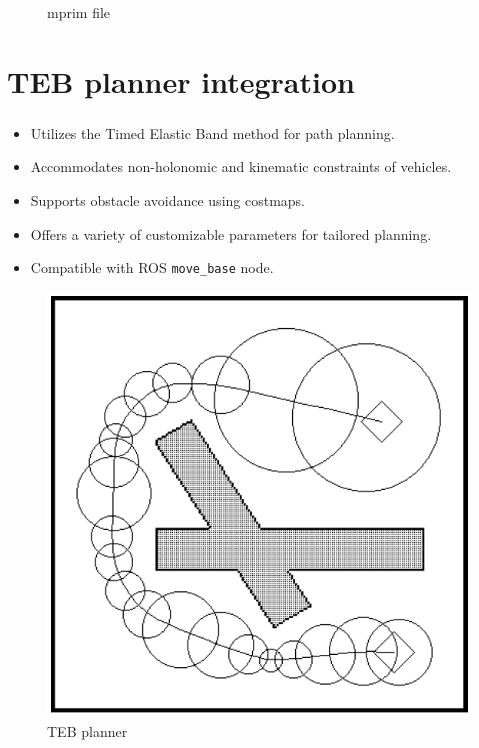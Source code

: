 \documentclass[numberofslides]{AMSBeamer}
\begin{document}
\begin{frame}[label=agenda]
\begin{minipage}{0.3\textwidth}
\begin{figure}
            \caption{mprim file}
        \end{figure}
    \end{minipage}
\end{frame}
\section{TEB planner integration}
\begin{frame}[label=agenda]
	\frametitle{\insertsectionhead}%
     \begin{minipage}{0.7\textwidth}

\begin{itemize}
  \item Utilizes the Timed Elastic Band method for path planning.
  \item Accommodates non-holonomic and kinematic constraints of vehicles.
  \item Supports obstacle avoidance using costmaps.
  \item Offers a variety of customizable parameters for tailored planning.
  \item Compatible with ROS \texttt{move\_base} node.
\end{itemize}
    \end{minipage}%
    \begin{minipage}{0.3\textwidth}
        \vspace{1cm}

        \begin{figure}
            \centering
            \includegraphics[width=1\linewidth]{Presentations/LaTeX/images/teb.png}
            \caption{TEB planner}
            \label{fig:enter-label}
        \end{figure}
    \end{minipage}
\end{frame}
\end{document}
